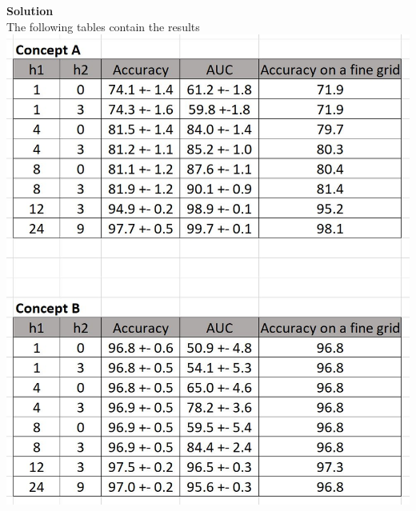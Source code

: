\documentclass[twoside]{article}
\begin{document}
\textbf{Solution}\\
The following tables contain the results\\
\includegraphics{Q1}
\end{document}
